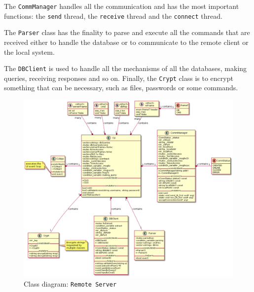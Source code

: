 The \texttt{CommManager} handles all the communication and has the most important functions: the \texttt{send} thread, the \texttt{receive} thread and the \texttt{connect} thread.

The \texttt{Parser} class has the finality to parse and execute all the commands that are received either to handle the database or to communicate to the remote client or the local system.

The  \texttt{DBClient} is used to handle all the mechanisms of all the databases, making queries, receiving responses and so on. Finally, the \texttt{Crypt} class is to encrypt something that can be necessary, such as files, passwords or some commands. 
%
\begin{figure}[htb!]
\centering
    \includegraphics[width=1.0\columnwidth]{./img/class-diag-rs-hugo.png}
  \caption{Class diagram: \texttt{Remote Server}}%
\label{fig:class-diag-rs}
\end{figure}

